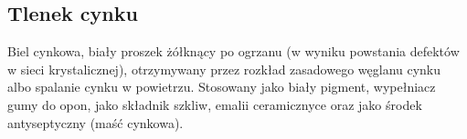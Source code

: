 \subsection{Tlenek cynku }
Biel cynkowa, biały proszek żółknący po ogrzanu (w wyniku powstania defektów w sieci krystalicznej), otrzymywany przez rozkład zasadowego węglanu cynku albo spalanie cynku w powietrzu.
Stosowany jako biały pigment, wypełniacz gumy do opon, jako składnik szkliw, emalii ceramicznyce oraz jako środek antyseptyczny (maść cynkowa).

